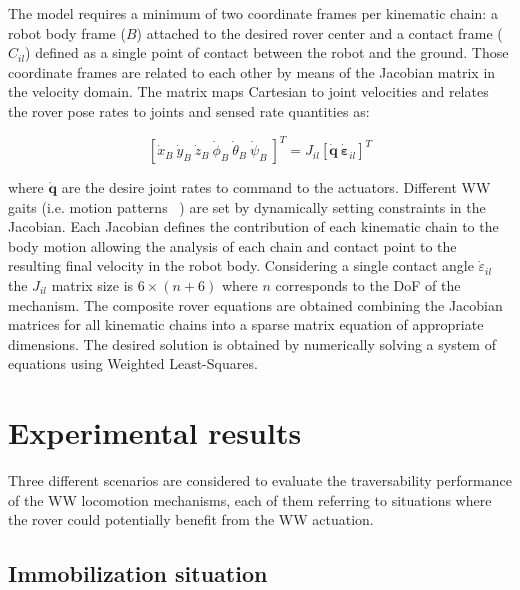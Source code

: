 \documentclass[a4paper,twocolumn]{esapub2005} %
\begin{document}
The model requires a minimum of two coordinate frames per kinematic chain: a
robot body frame ($B$) attached to the desired rover center and a contact frame
($C_{il}$) defined as a single point of contact between the robot and the
ground. Those coordinate frames are related to each other by means of the
Jacobian matrix in the velocity domain. The matrix maps Cartesian to joint
velocities and relates the rover pose rates to joints and sensed rate
quantities as:

\begin{equation}
    \left[\dot{x}_{B} ~ \dot{y}_{B} ~ \dot{z}_{B} ~ \dot{\phi}_{B}
    ~ \dot{\theta}_{B} ~ \dot{\psi}_{B} ~ \right]^T = J_{il}
    \left[\boldsymbol{\dot{q}} ~ \boldsymbol{\dot{\varepsilon}}_{il} \right]^T
    \label{eq:wheeljacobian}
\end{equation}

where $\boldsymbol{\dot{q}}$ are the desire joint rates to command to the
actuators.  Different WW gaits (i.e. motion patterns ~\cite{LucWalkingGaits}) are set by
dynamically setting constraints in the Jacobian. Each Jacobian defines the
contribution of each kinematic chain to the body motion allowing the analysis
of each chain and contact point to the resulting final velocity in the robot
body.  Considering a single contact angle $\dot{\varepsilon}_{il}$ the $J_{il}$
matrix size is $6 \times (n + 6)$ where $n$ corresponds to the DoF of the
mechanism.  The composite rover equations are obtained combining the Jacobian
matrices for all kinematic chains into a sparse matrix equation of appropriate
dimensions. The desired solution is obtained by numerically solving a system of
equations using Weighted Least-Squares.



\section{Experimental results}

Three different scenarios are considered to evaluate the traversability
performance of the WW locomotion mechanisms, each of them referring
to situations where the rover could potentially benefit from the WW
actuation.

\subsection{Immobilization situation} 
\end{document}

